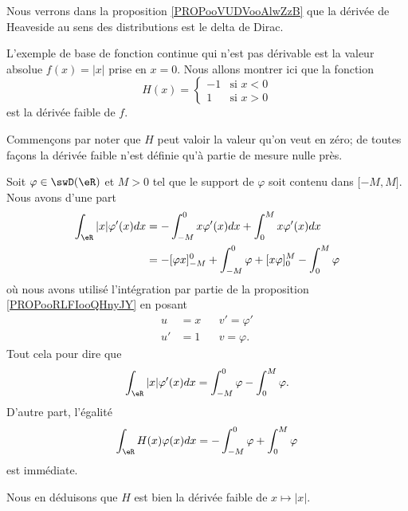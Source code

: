 \begin{normaltext}
	Nous verrons dans la proposition \ref{PROPooVUDVooAlwZzB} que la dérivée de Heaveside au sens des distributions est le delta de Dirac.
\end{normaltext}

\begin{example}
	L'exemple de base de fonction continue qui n'est pas dérivable est la valeur absolue \( f(x)=| x |\) prise en \( x=0\). Nous allons montrer ici que la fonction
	\begin{equation}
		H(x)=\begin{cases}
			-1 & \text{si } x<0 \\
			1  & \text{si } x>0
		\end{cases}
	\end{equation}
	est la dérivée faible de \( f\).

	Commençons par noter que \( H\) peut valoir la valeur qu'on veut en zéro; de toutes façons la dérivée faible n'est définie qu'à partie de mesure nulle près.

	Soit \( \varphi\in \swD(\eR)\) et \( M>0\) tel que le support de \( \varphi\) soit contenu dans \( \mathopen[ -M , M \mathclose]\). Nous avons d'une part
	\begin{subequations}
		\begin{align}
			\int_{\eR}| x |\varphi'(x)dx & =-\int_{-M}^0x\varphi'(x)dx+\int_0^Mx\varphi'(x)dx                     \\
			                             & =-[\varphi x]_{-M}^0+\int_{-M}^0\varphi+[x\varphi]_0^M-\int_0^M\varphi
		\end{align}
	\end{subequations}
	où nous avons utilisé l'intégration par partie de la proposition \ref{PROPooRLFIooQHnyJY} en posant
	\begin{subequations}
		\begin{align}
			u  & =x &  & v'=\varphi' \\
			u' & =1 &  & v=\varphi.
		\end{align}
	\end{subequations}
	Tout cela pour dire que
	\begin{equation}
		\int_{\eR}| x |\varphi'(x)dx=\int_{-M}^0\varphi-\int_0^M\varphi.
	\end{equation}
	D'autre part, l'égalité
	\begin{equation}
		\int_{\eR}H(x)\varphi(x)dx= -\int_{-M}^0\varphi+\int_0^M\varphi
	\end{equation}
	est immédiate.

	Nous en déduisons que \( H\) est bien la dérivée faible de \( x\mapsto | x |\).
\end{example}


